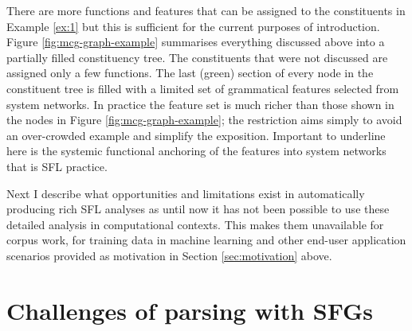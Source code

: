     There are more functions and features that can be assigned to the constituents in Example \ref{ex:1} but this is sufficient for the current purposes of introduction. Figure \ref{fig:mcg-graph-example} summarises everything discussed above into a partially filled constituency tree. The constituents that were not discussed are assigned only a few functions. %
    The last (green) section of every node in the constituent tree is filled with a limited set of grammatical features selected from system networks. In practice the feature set is much richer than those shown in the nodes in Figure \ref{fig:mcg-graph-example}; the restriction aims simply to avoid an over-crowded example and simplify the exposition. Important to underline here is the systemic functional anchoring of the features into system networks that is SFL practice.
    
    
    Next I describe what opportunities and limitations exist in automatically producing rich SFL analyses as until now it has not been possible to use these detailed analysis in computational contexts. This makes them unavailable for corpus work, for training data in machine learning and other end-user application scenarios provided as motivation in Section \ref{sec:motivation} above.

\section{Challenges of parsing with SFGs}
\label{sec:problem}
    
    
